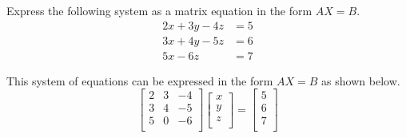 \begin{example}
    Express the following system as a matrix equation in the form $AX = B$.
    \begin{align*}
        2x + 3y - 4z & = 5 \\
        3x + 4y - 5z & = 6 \\
        5x - 6z      & = 7
    \end{align*}
\end{example}

\begin{solution}
    This system of equations can be expressed in the form $AX = B$ as shown below.
    \[
        \begin{bmatrix}
            2 & 3 & -4 \\
            3 & 4 & -5 \\
            5 & 0 & -6 \\
        \end{bmatrix}
        \begin{bmatrix}
            x \\
            y \\
            z \\
        \end{bmatrix}
        =
        \begin{bmatrix}
            5 \\
            6 \\
            7 \\
        \end{bmatrix}
    \]
\end{solution}
